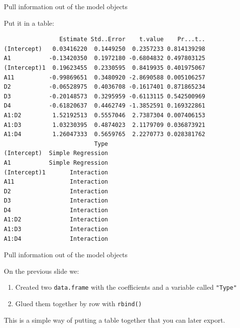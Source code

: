 \begin{frame}[fragile]{Pull information out of the model objects}

Put it in a table:

\begin{Shaded}
\begin{Highlighting}[]
\NormalTok{(}\NormalTok{(}\OperatorTok{$}\NormalTok{=}\NormalTok{),}
      \NormalTok{(}\OperatorTok{$}\NormalTok{=}\NormalTok{))}
\end{Highlighting}
\end{Shaded}

\begin{verbatim}
                Estimate Std..Error    t.value    Pr...t..
(Intercept)   0.03416220  0.1449250  0.2357233 0.814139298
A1           -0.13420350  0.1972180 -0.6804832 0.497803125
(Intercept)1  0.19623455  0.2330595  0.8419935 0.401975067
A11          -0.99869651  0.3480920 -2.8690588 0.005106257
D2           -0.06528975  0.4036708 -0.1617401 0.871865234
D3           -0.20148573  0.3295959 -0.6113115 0.542500969
D4           -0.61820637  0.4462749 -1.3852591 0.169322861
A1:D2         1.52192513  0.5557046  2.7387304 0.007406153
A1:D3         1.03230395  0.4874023  2.1179709 0.036873921
A1:D4         1.26047333  0.5659765  2.2270773 0.028381762
                          Type
(Intercept)  Simple Regression
A1           Simple Regression
(Intercept)1       Interaction
A11                Interaction
D2                 Interaction
D3                 Interaction
D4                 Interaction
A1:D2              Interaction
A1:D3              Interaction
A1:D4              Interaction
\end{verbatim}

\end{frame}

\begin{frame}[fragile]{Pull information out of the model objects}

\Large
On the previous slide we:

\begin{enumerate}
\def\labelenumi{\arabic{enumi}.}
\tightlist
\item
  Created two \texttt{data.frame} with the coefficients and a variable
  called \texttt{"Type"}
\item
  Glued them together by row with \texttt{rbind()}
\end{enumerate}

This is a simple way of putting a table together that you can later
export.

\end{frame}

